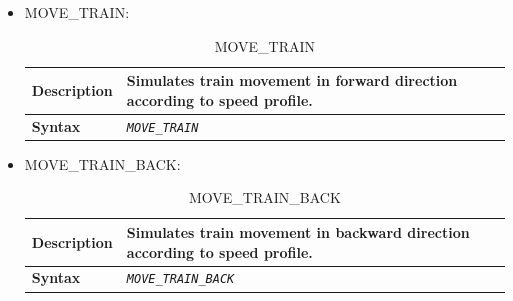 \begin{itemize}
\begin{longtable}{|l|l|l|}
			\hline \hline

		\end{longtable}

	\item MOVE\_TRAIN:

		\begin{longtable}{|l|l|}
		\caption{MOVE\_TRAIN}\\

			\hline

				\begin{minipage}[t]{0.22\linewidth} \textbf{Description} \end{minipage}
			&	\begin{minipage}[t]{0.78\linewidth} Simulates train movement in forward direction according to speed profile. \end{minipage} \\

			\hline

				\begin{minipage}[t]{0.22\linewidth} \textbf{Syntax} \end{minipage}
			&	\begin{minipage}[t]{0.78\linewidth} \emph{\texttt{MOVE\_TRAIN}} \end{minipage} \\

			\hline \hline

		\end{longtable}

	\item MOVE\_TRAIN\_BACK:

		\begin{longtable}{|l|l|}
		\caption{MOVE\_TRAIN\_BACK}\\

			\hline

				\begin{minipage}[t]{0.22\linewidth} \textbf{Description} \end{minipage}
			&	\begin{minipage}[t]{0.78\linewidth} Simulates train movement in backward direction according to speed profile. \end{minipage} \\

			\hline

				\begin{minipage}[t]{0.22\linewidth} \textbf{Syntax} \end{minipage}
			&	\begin{minipage}[t]{0.78\linewidth} \emph{\texttt{MOVE\_TRAIN\_BACK}} \end{minipage} \\


\end{longtable}
\end{itemize}
